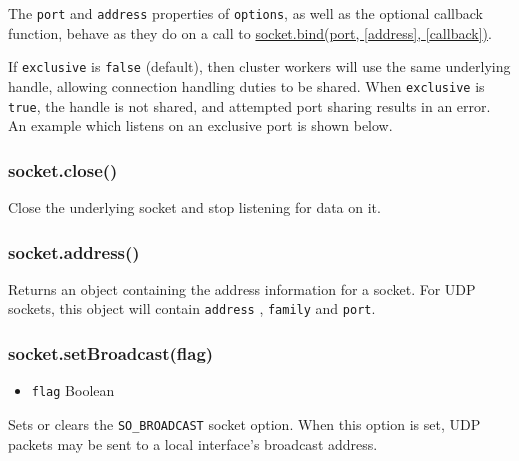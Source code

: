 The \texttt{port} and \texttt{address} properties of \texttt{options},
as well as the optional callback function, behave as they do on a call
to
\hyperref[dgramux5fsocketux5fbindux5fportux5faddressux5fcallback]{socket.bind(port,
{[}address{]}, {[}callback{]})}.

If \texttt{exclusive} is \texttt{false} (default), then cluster workers
will use the same underlying handle, allowing connection handling duties
to be shared. When \texttt{exclusive} is \texttt{true}, the handle is
not shared, and attempted port sharing results in an error. An example
which listens on an exclusive port is shown below.

\begin{Shaded}
\begin{Highlighting}[]
\NormalTok{(\{}
  \NormalTok{: }\NormalTok{,}
  \NormalTok{: }\NormalTok{,}
  \NormalTok{: }
\NormalTok{\});}
\end{Highlighting}
\end{Shaded}

\subsubsection{socket.close()}\label{socket.close}

Close the underlying socket and stop listening for data on it.

\subsubsection{socket.address()}\label{socket.address}

Returns an object containing the address information for a socket. For
UDP sockets, this object will contain \texttt{address} , \texttt{family}
and \texttt{port}.

\subsubsection{socket.setBroadcast(flag)}\label{socket.setbroadcastflag}

\begin{itemize}
\itemsep1pt\parskip0pt
\item
  \texttt{flag} Boolean
\end{itemize}

Sets or clears the \texttt{SO\_BROADCAST} socket option. When this
option is set, UDP packets may be sent to a local interface's broadcast
address.

